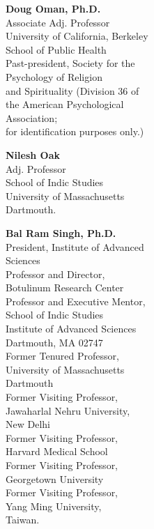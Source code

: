 \begin{multicols}{2}
\begin{trivlist}
\item \textbf{Doug Oman, Ph.D.}\\
Associate Adj. Professor\\
University of California, Berkeley\\
School of Public Health\\
Past-president, Society for the\\ Psychology of Religion\\ 
and Spirituality (Division 36 of\\ 
the American Psychological\\ 
Association;\\  
for identification purposes only.) 
 
\item \textbf{Nilesh Oak}\\ 
Adj. Professor\\
School of Indic Studies\\
University of Massachusetts\\ Dartmouth.
 
\item \textbf{Bal Ram Singh, Ph.D.}\\ 
President, Institute of Advanced\\ Sciences\\[2pt]
Professor and Director,\\ 
Botulinum Research Center\\[2pt]
Professor and Executive Mentor,\\ 
School of Indic Studies\\
Institute of Advanced Sciences\\
Dartmouth, MA 02747\\[2pt]
Former Tenured Professor,\\ 
University of Massachusetts\\ Dartmouth\\[2pt]
Former Visiting Professor,\\ 
Jawaharlal Nehru University,\\ 
New Delhi\\[2pt]
Former Visiting Professor,\\ 
Harvard Medical School\\[2pt]
Former Visiting Professor,\\ 
Georgetown University\\[2pt]
Former Visiting Professor,\\ 
Yang Ming University,\\ 
Taiwan.
 

\end{trivlist}
\end{multicols}
